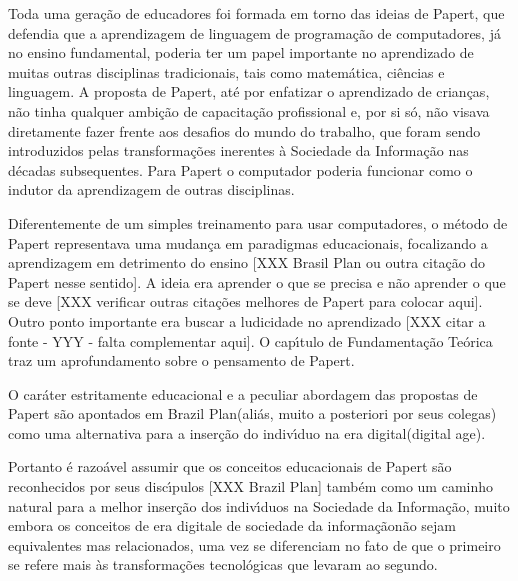 \documentclass[
12pt,		%
openright,	%
twoside,  %
a4paper,			%
chapter=TITLE,		%
english,			%
french,				%
spanish,			%
brazil				%
]{USPSC-classe/USPSC_RedarTex}
\begin{document}
Toda uma gera\c{c}\~ao de educadores foi formada em torno das ideias de Papert, que defendia que a aprendizagem de linguagem de programa\c{c}\~ao de computadores, j\'a no ensino fundamental, poderia ter um papel importante no aprendizado de muitas outras disciplinas tradicionais, tais como matem\'atica, ci\^encias e linguagem. A proposta de Papert, at\'e por enfatizar o aprendizado de crian\c{c}as, n\~ao tinha qualquer ambi\c{c}\~ao de capacita\c{c}\~ao profissional e, por si s\'o, n\~ao visava diretamente fazer frente aos desafios do \textquotedbl mundo do trabalho\textquotedbl , que foram sendo introduzidos pelas transforma\c{c}\~oes inerentes \`a Sociedade da Informa\c{c}\~ao nas d\'ecadas subsequentes. Para Papert o computador poderia funcionar como o indutor da aprendizagem de outras disciplinas.








Diferentemente de um simples treinamento para usar computadores, o m\'etodo de Papert representava uma mudan\c{c}a em paradigmas educacionais, focalizando a aprendizagem em detrimento do ensino [XXX Brasil Plan ou outra cita\c{c}\~ao do Papert nesse sentido]. A ideia era \textquotedbl aprender o que se precisa e n\~ao \textquotedbl aprender o que se deve [XXX verificar outras cita\c{c}\~oes melhores de Papert para colocar aqui]. Outro ponto importante era buscar a ludicidade no aprendizado [XXX citar a fonte - YYY - falta complementar aqui]. O cap\'{\i}tulo de Fundamenta\c{c}\~ao Te\'orica traz um aprofundamento sobre o pensamento de Papert.








O car\'ater estritamente educacional e a peculiar abordagem das propostas de Papert s\~ao apontados em \textquotedbl Brazil Plan\textquotedbl  [XXX] (ali\'as, muito a posteriori por seus colegas) como uma alternativa para a inser\c{c}\~ao do indiv\'{\i}duo na \textquotedbl era digital\textquotedbl  (digital age).








Portanto \'e razo\'avel assumir que os conceitos educacionais de Papert s\~ao reconhecidos por seus disc\'{\i}pulos [XXX Brazil Plan] tamb\'em como um caminho natural para a melhor inser\c{c}\~ao dos indiv\'{\i}duos na Sociedade da Informa\c{c}\~ao, muito embora os conceitos de \textquotedbl era digital\textquotedbl  e de \textquotedbl sociedade da informa\c{c}\~ao\textquotedbl  n\~ao sejam equivalentes mas relacionados, uma vez se diferenciam no fato de que o primeiro se refere mais \`as transforma\c{c}\~oes tecnol\'ogicas que levaram ao segundo.
\end{document}
